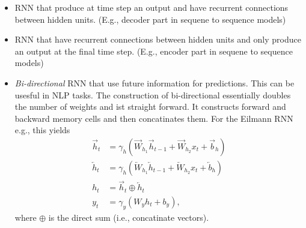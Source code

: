 \documentclass[12pt,a4paper]{article}
\begin{document}
\begin{itemize}
	\item RNN that produce at time step an output and have recurrent connections between hidden units. (E.g., decoder part in sequene to sequence models)
	\item RNN that have recurrent connections between hidden units and only produce an output at the final time step. (E.g., encoder part in sequene to sequence models)
	\item \textit{Bi-directional} RNN that use future information for predictions. This can be usesful in NLP tasks. The construction of bi-directional essentially doubles the number of weights and ist straight forward. It constructs forward and backward memory cells and then concatinates them. For the Eilmann RNN e.g., this yields
	\begin{align}
		 \overrightarrow{h}_t &= \gamma_h\left(\overrightarrow{W}_{h_1} \overrightarrow{h}_{t-1} + \overrightarrow{W}_{h_2} x_t + \overrightarrow{b}_h\right) \\
		 \overleftarrow{h}_t &= \gamma_h\left(\overleftarrow{W}_{h_1} \overleftarrow{h}_{t-1} + \overleftarrow{W}_{h_2} x_t + \overleftarrow{b}_h\right) \\
		 h_t  & = \overrightarrow{h}_t \oplus  \overleftarrow{h}_t \\
		y_t &= \gamma_y\left(W_y h_t + b_y\right),
	\end{align}
where $\oplus$ is the direct sum (i.e., concatinate vectors).
\end{itemize}
\end{document}
